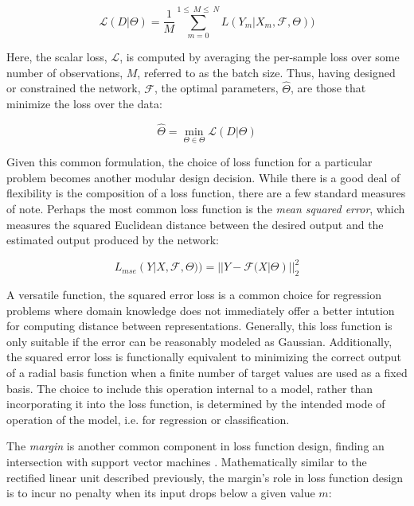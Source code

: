 \begin{equation}
\label{eq:genloss}
\mathcal{L}(D | \Theta) =  \frac{1}{M}\sum_{m=0}^{1\leq~M\leq~N}L(Y_m | X_m, \mathcal{F}, \Theta))
\end{equation}

\noindent Here, the scalar loss, $\mathcal{L}$, is computed by averaging the per-sample loss over some number of observations, $M$, referred to as the batch size.
Thus, having designed or constrained the network, $\mathcal{F}$, the optimal parameters, $\hat{\Theta}$, are those that minimize the loss over the data:

\begin{equation}
\label{eq:genloss}
\hat{\Theta} = \min\limits_{\Theta \in \mathcal{\Theta}}\mathcal{L}(D | \Theta)
\end{equation}

Given this common formulation, the choice of loss function for a particular problem becomes another modular design decision.
While there is a good deal of flexibility is the composition of a loss function, there are a few standard measures of note.
Perhaps the most common loss function is the \emph{mean squared error}, which measures the squared Euclidean distance between the desired output and the estimated output produced by the network:

\begin{equation}
\label{eq:mse}
L_{mse}(Y | X, \mathcal{F}, \Theta)) = || Y - \mathcal{F}(X | \Theta) ||_2^2
\end{equation}

\noindent A versatile function, the squared error loss is a common choice for regression problems where domain knowledge does not immediately offer a better intution for computing distance between representations.
Generally, this loss function is only suitable if the error can be reasonably modeled as Gaussian.
Additionally, the squared error loss is functionally equivalent to minimizing the correct output of a radial basis function when a finite number of target values are used as a fixed basis.
The choice to include this operation internal to a model, rather than incorporating it into the loss function, is determined by the intended mode of operation of the model, i.e. for regression or classification.

The \emph{margin} is another common component in loss function design, finding an intersection with support vector machines \cite{Bishop2006Pattern}.
Mathematically similar to the rectified linear unit described previously, the margin's role in loss function design is to incur no penalty when its input drops below a given value $m$:

